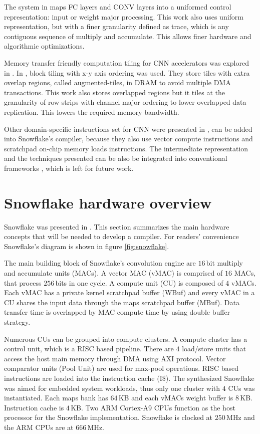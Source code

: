 \documentclass{sig-alternate}
\begin{document}
The system in \cite{zhang_caffeine} maps FC layers and CONV layers into a uniformed control representation: input or weight major processing. This work also uses uniform representation, but with a finer granularity defined as trace, which is any contiguous sequence of multiply and accumulate. This allows finer hardware and algorithmic optimizations. 

Memory transfer friendly computation tiling for CNN accelerators was explored in \cite{memory_cnn, striptilecnn}. In \cite{hw_neurostream}, block tiling with x-y axis ordering was used. They store tiles with extra overlap regions, called augmented-tiles, in DRAM to avoid multiple DMA transactions. This work also stores overlapped regions but it tiles at the granularity of row strips with channel major ordering to lower overlapped data replication. This lowers the required memory bandwidth.

Other domain-specific instructions set for CNN were presented in \cite{isa_cambricon}, can be added into Snowflake's compiler, because they also use vector compute instructions and scratchpad on-chip memory loads instructions. The intermediate representation and the techniques presented can be also be integrated into conventional frameworks \cite{sw_llvm}, which is left for future work. 


\section{Snowflake hardware overview}
Snowflake was presented in \cite{snowflake}. This section summarizes the main hardware concepts that will be needed to develop a compiler. For readers' convenience Snowflake's diagram is shown in figure \ref{fig:snowflake}. 

The main building block of Snowflake's convolution engine are $16$\,bit multiply and accumulate units (MACs). A vector MAC (vMAC) is comprised of $16$ MACs, that process $256$\,bits in one cycle. A compute unit (CU) is composed of $4$ vMACs. Each vMAC has a private kernel scratchpad buffer (WBuf) and every vMAC in a CU shares the input data through the maps scratchpad buffer (MBuf). Data transfer time is overlapped by MAC compute time by using double buffer strategy.

Numerous CUs can be grouped into compute clusters. A compute cluster has a control unit, which is a RISC based pipeline. There are $4$ load/store units that access the host main memory through DMA using AXI protocol. Vector comparator units (Pool Unit) are used for max-pool operations. RISC based instructions are loaded into the instruction cache (I\$). The synthesized Snowflake was aimed for embedded system workloads, thus only one cluster with $4$ CUs was instantiated. Each maps bank has $64$\,KB and each vMACs weight buffer is $8$\,KB. Instruction cache is $4$\,KB. Two ARM Cortex-A9 CPUs function as the host processor for the Snowflake implementation. Snowflake is clocked at $250$\,MHz and the ARM CPUs are at $666$\,MHz.
\end{document}
